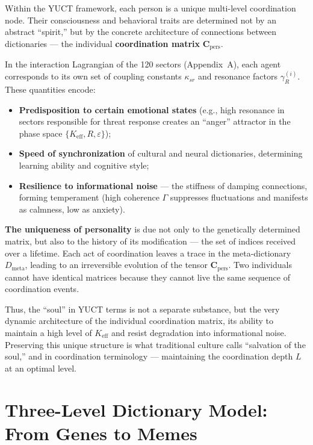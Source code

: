 \documentclass[12pt,a4paper]{article}
\begin{document}
	Within the YUCT framework, each person is a unique multi-level coordination node. Their consciousness and behavioral traits are determined not by an abstract ``spirit,'' but by the concrete architecture of connections between dictionaries — the individual \textbf{coordination matrix} $\mathbf{C}_{\text{pers}}$.
	
	In the interaction Lagrangian of the 120 sectors (Appendix~A), each agent corresponds to its own set of coupling constants $\kappa_{sr}$ and resonance factors $\gamma_{R}^{(i)}$. These quantities encode:
	\begin{itemize}
		\item \textbf{Predisposition to certain emotional states} (e.g., high resonance in sectors responsible for threat response creates an ``anger'' attractor in the phase space $\{K_{\mathrm{eff}}, R, \varepsilon\}$);
		\item \textbf{Speed of synchronization} of cultural and neural dictionaries, determining learning ability and cognitive style;
		\item \textbf{Resilience to informational noise} — the stiffness of damping connections, forming temperament (high coherence $\Gamma$ suppresses fluctuations and manifests as calmness, low as anxiety).
	\end{itemize}
	
	\textbf{The uniqueness of personality} is due not only to the genetically determined matrix, but also to the history of its modification — the set of indices received over a lifetime. Each act of coordination leaves a trace in the meta-dictionary $D_{\text{meta}}$, leading to an irreversible evolution of the tensor $\mathbf{C}_{\text{pers}}$. Two individuals cannot have identical matrices because they cannot live the same sequence of coordination events.
	
	Thus, the ``soul'' in YUCT terms is not a separate substance, but the very dynamic architecture of the individual coordination matrix, its ability to maintain a high level of $K_{\mathrm{eff}}$ and resist degradation into informational noise. Preserving this unique structure is what traditional culture calls ``salvation of the soul,'' and in coordination terminology — maintaining the coordination depth $L$ at an optimal level.
	
	\section{Three-Level Dictionary Model: From Genes to Memes}
	
\end{document}
